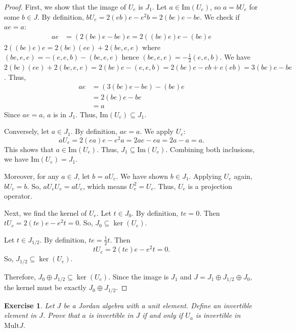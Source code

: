 \documentclass{article}
\newtheorem{exercise}[theorem]{Exercise}
\begin{document}
\begin{proof}  
First, we show that the image of $U_e$ is $J_1$. Let $a \in \mathrm{Im}(U_e)$, so $a = bU_e$ for some $b \in J$. By definition, $bU_e = 2(eb)e - e^2b = 2(be)e - be$.  
We check if $ae = a$:  
\begin{align*}  
    ae &= (2(be)e - be)e = 2((be)e)e - (be)e  
\end{align*}  
$ 2((be)e)e=2(be)(ee)+2(be,e,e) $ where $ (be,e,e)=-(e,e,b)-(be,e,e) $ hence $ (be,e,e)=-\frac{1}{2}(e,e,b) $. We have $2(be)(ee)+2(be,e,e)= 2(be)e-(e,e,b)=2(be)e-eb+e(eb)=3(be)e - be $. Thus,    
\begin{align*}  
    ae &= (3(be)e - be) - (be)e \\
    &= 2(be)e - be \\
    &= a  
\end{align*}  
Since $ae=a$, $a$ is in $J_1$. Thus, $\mathrm{Im}(U_e) \subseteq J_1$.  

Conversely, let $a \in J_1$. By definition, $ae = a$. We apply $U_e$:  
\[ aU_e = 2(ea)e - e^2a = 2ae - ea = 2a - a = a. \]  
This shows that $a \in \mathrm{Im}(U_e)$. Thus, $J_1 \subseteq \mathrm{Im}(U_e)$.  
Combining both inclusions, we have $\mathrm{Im}(U_e) = J_1$.  

Moreover, for any $a \in J$, let $b=aU_e$. We have shown $b \in J_1$. Applying $U_e$ again, $bU_e = b$. So, $aU_eU_e = aU_e$, which means $U_e^2 = U_e$. Thus, $U_e$ is a projection operator.  

Next, we find the kernel of $U_e$. Let $t \in J_0$. By definition, $te=0$. Then $tU_e = 2(te)e - e^2t = 0$. So, $J_0 \subseteq \ker(U_e)$.  

Let $t \in J_{1/2}$. By definition, $te = \frac{1}{2}t$. Then  
\[ tU_e = 2(te)e - e^2t = 0. \]  
So, $J_{1/2} \subseteq \ker(U_e)$.  

Therefore, $J_0 \oplus J_{1/2} \subseteq \ker(U_e)$. Since the image is $J_1$ and $J=J_1 \oplus J_{1/2} \oplus J_0$, the kernel must be exactly $J_0 \oplus J_{1/2}$.  
\end{proof}  

\begin{exercise}
Let $J$ be a Jordan algebra with a unit element. Define an invertible element in $J$. Prove that $a$ is invertible in $J$ if and only if $U_a$ is invertible in $\text{Mult}J$.  
\end{exercise}
\end{document}
